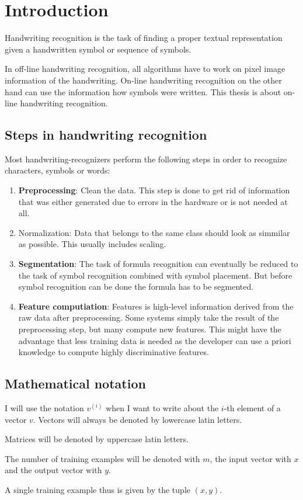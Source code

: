 \chapter{Introduction}\label{ch:Introduction}

Handwriting recognition is the task of finding a proper textual representation
given a handwritten symbol or sequence of symbols.

In off-line handwriting recognition, all algorithms have to work on pixel image
information of the handwriting. On-line handwriting recognition on the other
hand can use the information how symbols were written. This thesis is about
on-line handwriting recognition.

\section{Steps in handwriting recognition}
Most handwriting-recognizers perform the following steps in order to recognize
characters, symbols or words:

\begin{enumerate}
    \item \textbf{Preprocessing}: Clean the data. This step is done to get rid
          of information that was either generated due to errors in the hardware %
          or is not needed at all.
    \item {Normalization}: Data that belongs to the same class should
         look as simmilar as possible. This usually includes scaling.
    \item \textbf{Segmentation}: The task of formula recognition can eventually
          be reduced to the task of symbol recognition combined with symbol
          placement. But before symbol recognition can be done the formula has
          to be segmented.
    \item \textbf{Feature computiation}: Features is high-level information derived
          from the raw data after preprocessing. Some systems simply take the
          result of the preprocessing step, but many compute new features. This
          might have the advantage that less training data is needed as the
          developer can use a priori knowledge to compute highly discriminative
          features.
\end{enumerate}

\section{Mathematical notation}
I will use the notation $v^{(i)}$ when I want to write about the $i$-th element
of a vector $v$. Vectors will always be denoted by lowercase latin letters.

Matrices will be denoted by uppercase latin letters.

The number of training examples will be denoted with $m$, the input vector with
$x$ and the output vector with $y$.

A single training example thus is given by the tuple $(x, y)$.